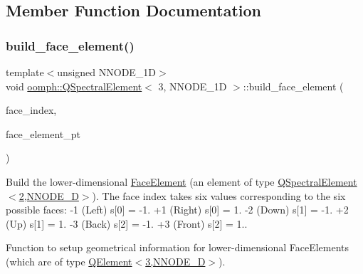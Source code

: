 \subsection{Member Function Documentation}
\mbox{\label{classoomph_1_1QSpectralElement_3_013_00_01NNODE__1D_01_4_a9e7972fdef1be6a698b2d66f1cffbbc9}} 
\subsubsection{\texorpdfstring{build\+\_\+face\+\_\+element()}{build\_face\_element()}}
{\footnotesize\ttfamily template$<$unsigned N\+N\+O\+D\+E\+\_\+1D$>$ \\
void \hyperlink{classoomph_1_1QSpectralElement}{oomph\+::\+Q\+Spectral\+Element}$<$ 3, N\+N\+O\+D\+E\+\_\+1D $>$\+::build\+\_\+face\+\_\+element (\begin{DoxyParamCaption}\item[{const int \&}]{face\+\_\+index,  }\item[{\hyperlink{classoomph_1_1FaceElement}{Face\+Element} $\ast$}]{face\+\_\+element\+\_\+pt }\end{DoxyParamCaption})\hspace{0.3cm}{\ttfamily [virtual]}}



Build the lower-\/dimensional \hyperlink{classoomph_1_1FaceElement}{Face\+Element} (an element of type \hyperlink{classoomph_1_1QSpectralElement_3_012_00_01NNODE__1D_01_4}{Q\+Spectral\+Element$<$2,\+N\+N\+O\+D\+E\+\_\+D$>$}). The face index takes six values corresponding to the six possible faces\+: -\/1 (Left) s\mbox{[}0\mbox{]} = -\/1. +1 (Right) s\mbox{[}0\mbox{]} = 1. -\/2 (Down) s\mbox{[}1\mbox{]} = -\/1. +2 (Up) s\mbox{[}1\mbox{]} = 1. -\/3 (Back) s\mbox{[}2\mbox{]} = -\/1. +3 (Front) s\mbox{[}2\mbox{]} = 1.. 

Function to setup geometrical information for lower-\/dimensional Face\+Elements (which are of type \hyperlink{classoomph_1_1QElement_3_013_00_01NNODE__1D_01_4}{Q\+Element$<$3,\+N\+N\+O\+D\+E\+\_\+D$>$}). 

